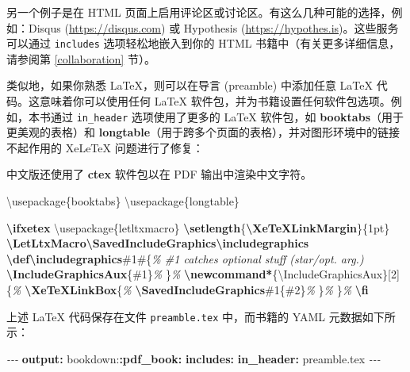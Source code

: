 \documentclass[
  12pt,
]{krantz}
\newenvironment{Shaded}{\begin{snugshade}}{\end{snugshade}}
\newcommand{\AttributeTok}[1]{\textcolor[rgb]{0.13,0.29,0.53}{#1}}
\newcommand{\BuiltInTok}[1]{#1}
\newcommand{\CommentTok}[1]{\textcolor[rgb]{0.56,0.35,0.01}{\textit{#1}}}
\newcommand{\ExtensionTok}[1]{#1}
\newcommand{\FunctionTok}[1]{\textcolor[rgb]{0.13,0.29,0.53}{\textbf{#1}}}
\newcommand{\KeywordTok}[1]{\textcolor[rgb]{0.13,0.29,0.53}{\textbf{#1}}}
\newcommand{\NormalTok}[1]{#1}
\newcommand{\PreprocessorTok}[1]{\textcolor[rgb]{0.56,0.35,0.01}{\textit{#1}}}
\renewenvironment{quote}{\begin{VF}}{\end{VF}}
\theoremstyle{definition}
\theoremstyle{definition}
\theoremstyle{definition}
\theoremstyle{definition}
\theoremstyle{remark}
\begin{document}
另一个例子是在 HTML 页面上启用评论区或讨论区。有这么几种可能的选择，例如：Disqus (\url{https://disqus.com}) 或 Hypothesis (\url{https://hypothes.is})。这些服务可以通过 \texttt{includes} 选项轻松地嵌入到你的 HTML 书籍中（有关更多详细信息，请参阅第 \ref{collaboration} 节）。

类似地，如果你熟悉 LaTeX，则可以在导言 (preamble) 中添加任意 LaTeX 代码。这意味着你可以使用任何 LaTeX 软件包，并为书籍设置任何软件包选项。例如，本书通过 \texttt{in\_header} 选项使用了更多的 LaTeX 软件包，如 \textbf{booktabs}（用于更美观的表格）和 \textbf{longtable}（用于跨多个页面的表格），并对图形环境中的链接不起作用的 XeLeTeX 问题进行了修复：

\begin{quote}
中文版还使用了 \textbf{ctex} 软件包以在 PDF 输出中渲染中文字符。
\end{quote}

\begin{Shaded}
\begin{Highlighting}[]
\BuiltInTok{\textbackslash{}usepackage}\NormalTok{\{}\ExtensionTok{booktabs}\NormalTok{\}}
\BuiltInTok{\textbackslash{}usepackage}\NormalTok{\{}\ExtensionTok{longtable}\NormalTok{\}}

\FunctionTok{\textbackslash{}ifxetex}
  \BuiltInTok{\textbackslash{}usepackage}\NormalTok{\{}\ExtensionTok{letltxmacro}\NormalTok{\}}
  \FunctionTok{\textbackslash{}setlength}\NormalTok{\{}\FunctionTok{\textbackslash{}XeTeXLinkMargin}\NormalTok{\}\{1pt\}}
  \FunctionTok{\textbackslash{}LetLtxMacro\textbackslash{}SavedIncludeGraphics\textbackslash{}includegraphics}
  \FunctionTok{\textbackslash{}def\textbackslash{}includegraphics}\NormalTok{\#1\#\{}\CommentTok{\% \#1 catches optional stuff (star/opt. arg.)}
    \FunctionTok{\textbackslash{}IncludeGraphicsAux}\NormalTok{\{\#1\}}\CommentTok{\%}
\NormalTok{  \}}\CommentTok{\%}
  \FunctionTok{\textbackslash{}newcommand*}\NormalTok{\{}\ExtensionTok{\textbackslash{}IncludeGraphicsAux}\NormalTok{\}[2]\{}\CommentTok{\%}
    \FunctionTok{\textbackslash{}XeTeXLinkBox}\NormalTok{\{}\CommentTok{\%}
      \FunctionTok{\textbackslash{}SavedIncludeGraphics}\NormalTok{\#1\{\#2\}}\CommentTok{\%}
\NormalTok{    \}}\CommentTok{\%}
\NormalTok{  \}}\CommentTok{\%}
\FunctionTok{\textbackslash{}fi}
\end{Highlighting}
\end{Shaded}

上述 LaTeX 代码保存在文件 \texttt{preamble.tex} 中，而书籍的 YAML 元数据如下所示：

\begin{Shaded}
\begin{Highlighting}[]
\PreprocessorTok{{-}{-}{-}}
\FunctionTok{output}\KeywordTok{:}
\AttributeTok{  bookdown:}\FunctionTok{:pdf\_book}\KeywordTok{:}
\AttributeTok{    }\FunctionTok{includes}\KeywordTok{:}
\AttributeTok{      }\FunctionTok{in\_header}\KeywordTok{:}\AttributeTok{ preamble.tex}
\PreprocessorTok{{-}{-}{-}}
\end{Highlighting}
\end{Shaded}
\end{document}
